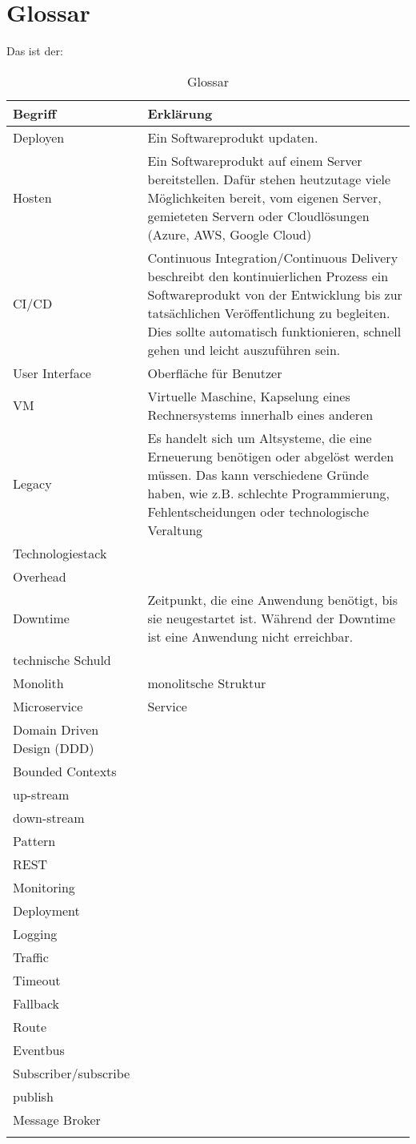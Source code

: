 \section{Glossar}

Das ist der:

	\begin{longtable}[center]{lp{10cm}}
				Begriff & Erklärung \\ \hline
				Deployen & Ein Softwareprodukt updaten.  \\
				Hosten & Ein Softwareprodukt auf einem Server bereitstellen. Dafür stehen heutzutage viele Möglichkeiten bereit, vom eigenen Server, gemieteten Servern oder Cloudlösungen (Azure, AWS, Google Cloud) \\
				CI/CD & Continuous Integration/Continuous Delivery beschreibt den kontinuierlichen Prozess ein Softwareprodukt von der Entwicklung bis zur tatsächlichen Veröffentlichung zu begleiten. Dies sollte automatisch funktionieren, schnell gehen und leicht auszuführen sein.  \\
				User Interface  & Oberfläche für Benutzer  \\
				VM & Virtuelle Maschine, Kapselung eines Rechnersystems innerhalb eines anderen  \\
				Legacy & Es handelt sich um Altsysteme, die eine Erneuerung benötigen oder abgelöst werden müssen. Das kann verschiedene Gründe haben, wie z.B. schlechte Programmierung, Fehlentscheidungen oder technologische Veraltung   \\
				Technologiestack &   \\
				Overhead &   \\
				Downtime & Zeitpunkt, die eine Anwendung benötigt, bis sie neugestartet ist. Während der Downtime ist eine Anwendung nicht erreichbar.  \\
				technische Schuld &   \\
				Monolith & monolitsche Struktur \\
				Microservice & Service  \\	
				Domain Driven Design (DDD) &  \\	
				Bounded Contexts & \\
				up-stream & \\
				down-stream & \\
				Pattern & \\
				REST & \\
				Monitoring & \\
				Deployment & \\
				Logging & \\
				Traffic & \\
				Timeout & \\
				Fallback & \\
				Route & \\
				Eventbus & \\
				Subscriber/subscribe & \\
				publish & \\
				Message Broker & \\
		\caption[Glossar]{Glossar}
	\end{longtable}
